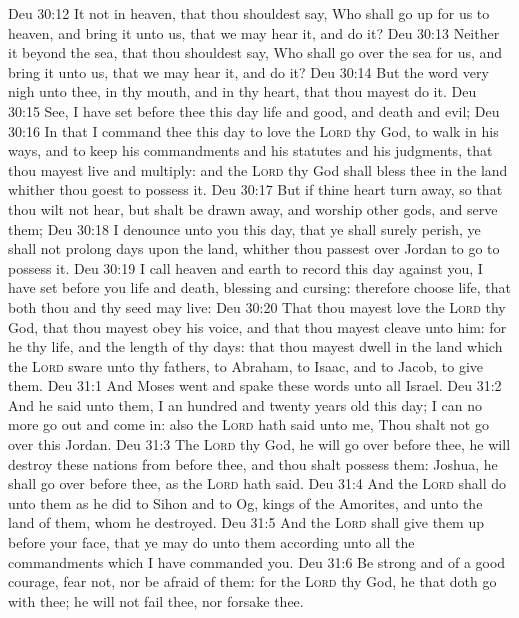 \vs Deu 30:12 It  not in heaven, that thou shouldest say, Who shall go up for us to heaven, and bring it unto us, that we may hear it, and do it?
\vs Deu 30:13 Neither  it beyond the sea, that thou shouldest say, Who shall go over the sea for us, and bring it unto us, that we may hear it, and do it?
\vs Deu 30:14 But the word  very nigh unto thee, in thy mouth, and in thy heart, that thou mayest do it.
\vs Deu 30:15 See, I have set before thee this day life and good, and death and evil;
\vs Deu 30:16 In that I command thee this day to love the \textsc{Lord} thy God, to walk in his ways, and to keep his commandments and his statutes and his judgments, that thou mayest live and multiply: and the \textsc{Lord} thy God shall bless thee in the land whither thou goest to possess it.
\vs Deu 30:17 But if thine heart turn away, so that thou wilt not hear, but shalt be drawn away, and worship other gods, and serve them;
\vs Deu 30:18 I denounce unto you this day, that ye shall surely perish,  ye shall not prolong  days upon the land, whither thou passest over Jordan to go to possess it.
\vs Deu 30:19 I call heaven and earth to record this day against you,  I have set before you life and death, blessing and cursing: therefore choose life, that both thou and thy seed may live:
\vs Deu 30:20 That thou mayest love the \textsc{Lord} thy God,  that thou mayest obey his voice, and that thou mayest cleave unto him: for he  thy life, and the length of thy days: that thou mayest dwell in the land which the \textsc{Lord} sware unto thy fathers, to Abraham, to Isaac, and to Jacob, to give them.
\vs Deu 31:1 And Moses went and spake these words unto all Israel.
\vs Deu 31:2 And he said unto them, I  an hundred and twenty years old this day; I can no more go out and come in: also the \textsc{Lord} hath said unto me, Thou shalt not go over this Jordan.
\vs Deu 31:3 The \textsc{Lord} thy God, he will go over before thee,  he will destroy these nations from before thee, and thou shalt possess them:  Joshua, he shall go over before thee, as the \textsc{Lord} hath said.
\vs Deu 31:4 And the \textsc{Lord} shall do unto them as he did to Sihon and to Og, kings of the Amorites, and unto the land of them, whom he destroyed.
\vs Deu 31:5 And the \textsc{Lord} shall give them up before your face, that ye may do unto them according unto all the commandments which I have commanded you.
\vs Deu 31:6 Be strong and of a good courage, fear not, nor be afraid of them: for the \textsc{Lord} thy God, he  that doth go with thee; he will not fail thee, nor forsake thee.
